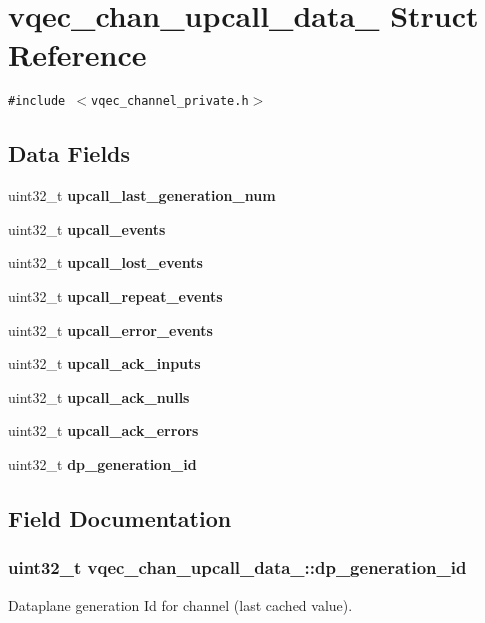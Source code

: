 \section{vqec\_\-chan\_\-upcall\_\-data\_\- Struct Reference}
\label{structvqec__chan__upcall__data__}
{\tt \#include $<$vqec\_\-channel\_\-private.h$>$}

\subsection*{Data Fields}
\begin{CompactItemize}
\item 
uint32\_\-t \bf{upcall\_\-last\_\-generation\_\-num}
\item 
uint32\_\-t \bf{upcall\_\-events}
\item 
uint32\_\-t \bf{upcall\_\-lost\_\-events}
\item 
uint32\_\-t \bf{upcall\_\-repeat\_\-events}
\item 
uint32\_\-t \bf{upcall\_\-error\_\-events}
\item 
uint32\_\-t \bf{upcall\_\-ack\_\-inputs}
\item 
uint32\_\-t \bf{upcall\_\-ack\_\-nulls}
\item 
uint32\_\-t \bf{upcall\_\-ack\_\-errors}
\item 
uint32\_\-t \bf{dp\_\-generation\_\-id}
\end{CompactItemize}


\subsection{Field Documentation}
\subsubsection{\setlength{\rightskip}{0pt plus 5cm}uint32\_\-t \bf{vqec\_\-chan\_\-upcall\_\-data\_\-::dp\_\-generation\_\-id}}\label{structvqec__chan__upcall__data___df9b45e944a1adf2715f15e52b713869}


Dataplane generation Id for channel (last cached value). 
